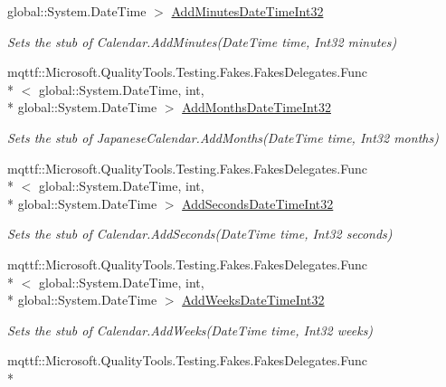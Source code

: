 \begin{DoxyCompactItemize}
global\-::\-System.\-Date\-Time $>$ \hyperlink{class_system_1_1_globalization_1_1_fakes_1_1_stub_japanese_calendar_a5e5accf2b7c529221f5af3ab86621dac}{Add\-Minutes\-Date\-Time\-Int32}
\begin{DoxyCompactList}\small\item\em Sets the stub of Calendar.\-Add\-Minutes(\-Date\-Time time, Int32 minutes)\end{DoxyCompactList}\item 
mqttf\-::\-Microsoft.\-Quality\-Tools.\-Testing.\-Fakes.\-Fakes\-Delegates.\-Func\\*
$<$ global\-::\-System.\-Date\-Time, int, \\*
global\-::\-System.\-Date\-Time $>$ \hyperlink{class_system_1_1_globalization_1_1_fakes_1_1_stub_japanese_calendar_ae5cdbd09e8c4c6ab1d623eff517aa014}{Add\-Months\-Date\-Time\-Int32}
\begin{DoxyCompactList}\small\item\em Sets the stub of Japanese\-Calendar.\-Add\-Months(\-Date\-Time time, Int32 months)\end{DoxyCompactList}\item 
mqttf\-::\-Microsoft.\-Quality\-Tools.\-Testing.\-Fakes.\-Fakes\-Delegates.\-Func\\*
$<$ global\-::\-System.\-Date\-Time, int, \\*
global\-::\-System.\-Date\-Time $>$ \hyperlink{class_system_1_1_globalization_1_1_fakes_1_1_stub_japanese_calendar_a5edfae7addd7ca45d48e33fa68c578d3}{Add\-Seconds\-Date\-Time\-Int32}
\begin{DoxyCompactList}\small\item\em Sets the stub of Calendar.\-Add\-Seconds(\-Date\-Time time, Int32 seconds)\end{DoxyCompactList}\item 
mqttf\-::\-Microsoft.\-Quality\-Tools.\-Testing.\-Fakes.\-Fakes\-Delegates.\-Func\\*
$<$ global\-::\-System.\-Date\-Time, int, \\*
global\-::\-System.\-Date\-Time $>$ \hyperlink{class_system_1_1_globalization_1_1_fakes_1_1_stub_japanese_calendar_a0d8e337709c0be8e71f33cdeefef5d23}{Add\-Weeks\-Date\-Time\-Int32}
\begin{DoxyCompactList}\small\item\em Sets the stub of Calendar.\-Add\-Weeks(\-Date\-Time time, Int32 weeks)\end{DoxyCompactList}\item 
mqttf\-::\-Microsoft.\-Quality\-Tools.\-Testing.\-Fakes.\-Fakes\-Delegates.\-Func\\*

\end{DoxyCompactItemize}
